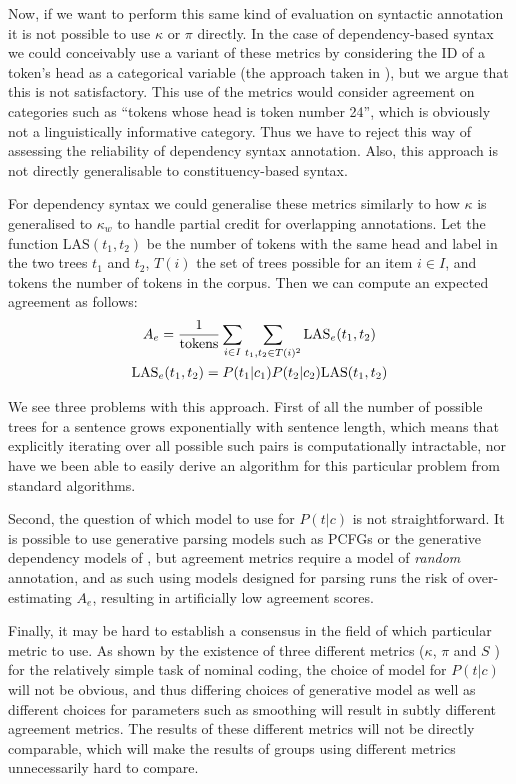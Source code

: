 \documentclass[11pt]{article}
\makeatletter
\let\citeN=\newcite
\let\oldfrac=\frac
\renewcommand\frac[2]{\mathchoice{\oldfrac{#1}{#2}}{\nicefrac{#1}{#2}}{\nicefrac{#1}{#2}}{\nicefrac{#1}{#2}}}
\def\noparencite#1#2{{#1\if@tempswa , #2\fi}}
\newcommand\citeNP[1]{{\let\@cite=\noparencite\cite{#1}}}
\makeatother
\begin{document}
Now, if we want to perform this same kind of evaluation on syntactic
annotation it is not possible to use $\kappa$ or $\pi$ directly. In the case
of dependency-based syntax we could conceivably use a variant of these metrics
by considering the ID of a token's head as a categorical variable (the
approach taken in \citeNP{Rag:Dic13}), but we argue that this is not
satisfactory. This use of the metrics would consider agreement on categories
such as ``tokens whose head is token number 24'', which is obviously not a
linguistically informative category. Thus we have to reject this way of
assessing the reliability of dependency syntax annotation. Also, this approach
is not directly generalisable to constituency-based syntax.

For dependency syntax we could generalise these metrics similarly to how
$\kappa$ is generalised to $\kappa_w$ to handle partial credit for overlapping
annotations. Let the function $\textrm{LAS}(t_1, t_2)$ be the number of tokens
with the same head and label in the two trees $t_1$ and $t_2$, $T(i)$ the set
of trees possible for an item $i\in I$, and $\textrm{tokens}$ the number of
tokens in the corpus. Then we can compute an expected agreement as follows:
\begin{gather}
    A_e = \frac{1}{\textrm{tokens}} \sum_{i\in I}\sum_{t_1,t_2\in T(i)^2}
    \textrm{LAS}_e(t_1, t_2) \\
    \textrm{LAS}_e(t_1, t_2) = P(t_1|c_1)P(t_2|c_2)\textrm{LAS}(t_1, t_2) \notag
\end{gather}

We see three problems with this approach. First of all the number of possible
trees for a sentence grows exponentially with sentence length, which means
that explicitly iterating over all possible such pairs is computationally
intractable, nor have we been able to easily derive an algorithm for this
particular problem from standard algorithms.

Second, the question of which model to use for $P(t|c)$ is not
straightforward. It is possible to use generative parsing models such as PCFGs
or the generative dependency models of \citeN{Eisner96}, but agreement metrics
require a model of \emph{random} annotation, and as such using models designed
for parsing runs the risk of over-estimating $A_e$, resulting in artificially
low agreement scores.

Finally, it may be hard to establish a consensus in the field of which
particular metric to use. As shown by the existence of three different metrics
($\kappa$, $\pi$ and $S$ \cite{Ben:Alp:Gol54}) for the relatively simple task
of nominal coding, the choice of model for $P(t|c)$ will not be obvious, and
thus differing choices of generative model as well as different choices for
parameters such as smoothing will result in subtly different agreement
metrics. The results of these different metrics will not be directly
comparable, which will make the results of groups using different metrics
unnecessarily hard to compare.
\end{document}
